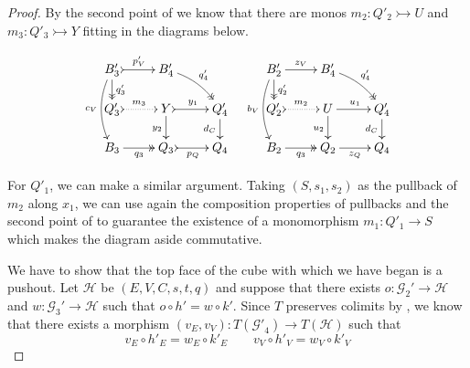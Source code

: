 \documentclass[a4paper,UKenglish,cleveref,pdftex,thm-restate,numberwithinsect]{lipics-v2021}
\def\B{\textbf {\textup{B}}}
\newcommand{\commentato}[1]{ {} }
\newcommand{\mto}{\rightarrowtail}
\begin{document}
\begin{proof}
	By the second point of  we know that there are monos $m_2\colon Q'_2\mto U$ and $m_3\colon Q'_3\mto Y$  fitting in the diagrams below.
	
	\[\xymatrix@R=15pt{B'_3 \ar@{>>}[d]^{q'_3} \ar@/_.3cm/[dd]_{c_V} \ar@{>->}[r]^{p'_V}& B'_4 \ar@/^.2cm/@{>>}[dr]^{q'_4} & & B'_2 \ar[r]^{z_V} \ar@{>>}[d]^{q'_2} \ar@/_.3cm/[dd]_{b_V}& B'_4 \ar@/^.2cm/@{>>}[dr]^{q'_4}\\ Q'_3 \ar@{>.>}[r]^{m_3}& Y  \ar@{>->}[r]^{y_1} \ar[d]_{y_2}& Q'_4 \ar[d]_{d_C}& Q'_2 \ar@{>.>}[r]^{m_2} & U \ar[d]_{u_2} \ar[r]^{u_1} & Q'_4 \ar[d]_{d_C} \\ B_3 \ar@{>>}[r]_{q_3} & Q_3 \ar@{>->}[r]_{p_Q} & Q_4 &B_2 \ar@{>>}[r]_{q_3} & Q_2 \ar[r]_{z_Q} & Q_4}\]

	\noindent 
	\parbox{8.5cm}{
	For $Q'_1$, we can make a similar argument. Taking $(S, s_1, s_2)$ as the pullback of $m_2$ along $x_1$, we can use again the composition properties of pullbacks and the second point of  to guarantee the existence of a monomorphism $m_1\colon Q'_1\to S$ which makes the diagram aside commutative.}\hfill
	\parbox{4cm}{}
	
	\commentato {Now, notice that
	\[s_1 \circ m_1 \circ q_1 = q'_2 \circ h'_V = h'_C \circ q'_1 \quad  	q'_4 \circ z'_V = z'_Q \circ q'_2= u_1\circ m_2 \circ q'_2\]
	
	\[
\begin{split}
	y_1 \circ m_3 \circ q'_3 &= p'_V \circ q'_4\\ &= p'_C \circ q'_3
\end{split}%
\]
Hence, $s_1\circ m_1 = h'_C$, $w \circ s_2 \circ m_1 = m_3 \circ k_C'$, $t'_C = u_1 \circ m_2$ and $p'_C = y_1 \circ m_3$.}

	We have to show that the top face of the cube with which we have began is a pushout. Let $\mathcal{H}$ be $(E, V, C, s, t, q)$ and suppose that there exists  $o\colon  \mathcal{G}_2' \to \mathcal{H}$ and $w\colon  \mathcal{G}_3' \to \mathcal{H}$ such that $o \circ h' = w \circ k'$. Since $T$ preserves colimits by , we know that there exists a morphism $(v_E, v_V)\colon T(\mathcal{G'}_4)\to T(\mathcal{H})$ such that	
\[v_E\circ h'_E=w_E\circ k'_E\qquad v_V\circ h'_V=w_V\circ k'_V\]
	

\end{proof}
\end{document}
